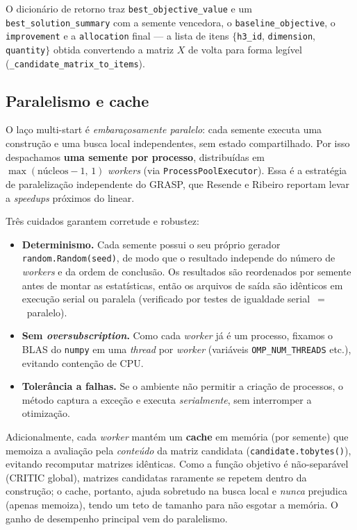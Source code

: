 \documentclass[11pt,a4paper]{article}
\begin{document}
O dicionário de retorno traz \texttt{best\_objective\_value} e um
\texttt{best\_solution\_summary} com a semente vencedora, o \texttt{baseline\_objective},
o \texttt{improvement} e a \texttt{allocation} final --- a lista de itens
$\{$\texttt{h3\_id}, \texttt{dimension}, \texttt{quantity}$\}$ obtida convertendo a
matriz $X$ de volta para forma legível (\texttt{\_candidate\_matrix\_to\_items}).

\subsection{Paralelismo e cache}
\label{sec:paralelismo}

O laço multi-start é \emph{embaraçosamente paralelo}: cada semente executa uma
construção e uma busca local independentes, sem estado compartilhado. Por isso
despachamos \textbf{uma semente por processo}, distribuídas em
$\max(\text{núcleos}-1,\,1)$ \emph{workers} (via \texttt{ProcessPoolExecutor}).
Essa é a estratégia de paralelização independente do GRASP, que Resende e Ribeiro
reportam levar a \emph{speedups} próximos do linear.

Três cuidados garantem corretude e robustez:
\begin{itemize}\setlength\itemsep{1pt}
\item \textbf{Determinismo.} Cada semente possui o seu próprio gerador
\texttt{random.Random(seed)}, de modo que o resultado independe do número de
\emph{workers} e da ordem de conclusão. Os resultados são reordenados por semente
antes de montar as estatísticas, então os arquivos de saída são idênticos em
execução serial ou paralela (verificado por testes de igualdade
serial~$=$~paralelo).
\item \textbf{Sem \emph{oversubscription}.} Como cada \emph{worker} já é um
processo, fixamos o BLAS do \texttt{numpy} em uma \emph{thread} por \emph{worker}
(variáveis \texttt{OMP\_NUM\_THREADS} etc.), evitando contenção de CPU.
\item \textbf{Tolerância a falhas.} Se o ambiente não permitir a criação de
processos, o método captura a exceção e executa \emph{serialmente}, sem
interromper a otimização.
\end{itemize}

Adicionalmente, cada \emph{worker} mantém um \textbf{cache} em memória (por semente)
que memoiza a avaliação pela \emph{conteúdo} da matriz candidata
(\texttt{candidate.tobytes()}), evitando recomputar matrizes idênticas. Como a
função objetivo é não-separável (CRITIC global), matrizes candidatas raramente se
repetem dentro da construção; o cache, portanto, ajuda sobretudo na busca local e
\emph{nunca} prejudica (apenas memoiza), tendo um teto de tamanho para não esgotar
a memória. O ganho de desempenho principal vem do paralelismo.
\end{document}
